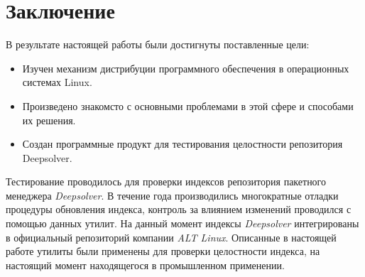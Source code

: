 \section*{Заключение}
В результате настоящей работы были достигнуты поставленные цели:
\begin{itemize}
\item{Изучен механизм дистрибуции программного обеспечения в операционных системах Linux.}
\item{Произведено знакомсто с основными проблемами в этой сфере и способами их решения.}
\item{Создан программные продукт для тестирования целостности репозитория Deepsolver.}
\end{itemize}
Тестирование проводилось для проверки индексов репозитория пакетного менеджера \textit{Deepsolver}.
В течение года производились многократные отладки процедуры обновления индекса, контроль
за влиянием изменений проводился с помощью данных утилит.
На данный момент индексы \textit{Deepsolver} интегрированы в официальный репозиторий
компании \textit{ALT Linux}. Описанные в настоящей работе утилиты были применены для 
проверки целостности индекса, на настоящий момент находящегося в промышленном применении.

